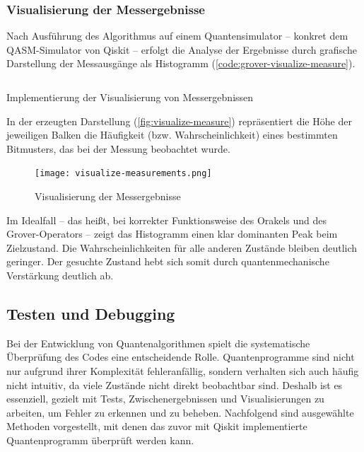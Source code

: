 \subsubsection*{Visualisierung der Messergebnisse}

Nach Ausführung des Algorithmus auf einem Quantensimulator – konkret dem QASM-Simulator von Qiskit – erfolgt die Analyse der Ergebnisse durch grafische Darstellung der Messausgänge als Histogramm (\autoref{code:grover-visualize-measure}).  

\begin{listing}[ht!]
  \inputminted{python}{code/grover-visualize-measure.py}
  \caption{Implementierung der Visualisierung von Messergebnissen}
  \label{code:grover-visualize-measure}
\end{listing}

In der erzeugten Darstellung (\autoref{fig:visualize-measure}) repräsentiert die Höhe der jeweiligen Balken die Häufigkeit (bzw. Wahrscheinlichkeit) eines bestimmten Bitmusters, das bei der Messung beobachtet wurde.

\begin{figure}
    \centering
    \texttt{[image: visualize-measurements.png]}
    \caption{Visualisierung der Messergebnisse}
    \label{fig:visualize-measure}
\end{figure}

Im Idealfall – das heißt, bei korrekter Funktionsweise des Orakels und des Grover-Operators – zeigt das Histogramm einen klar dominanten Peak beim Zielzustand.  Die Wahrscheinlichkeiten für alle anderen Zustände bleiben deutlich geringer.  Der gesuchte Zustand hebt sich somit durch quantenmechanische Verstärkung deutlich ab.

\subsection{Testen und Debugging}

Bei der Entwicklung von Quantenalgorithmen spielt die systematische Überprüfung des Codes eine entscheidende Rolle. Quantenprogramme sind nicht nur aufgrund ihrer Komplexität fehleranfällig, sondern verhalten sich auch häufig nicht intuitiv, da viele Zustände nicht direkt beobachtbar sind. Deshalb ist es essenziell, gezielt mit Tests, Zwischenergebnissen und Visualisierungen zu arbeiten, um Fehler zu erkennen und zu beheben. Nachfolgend sind ausgewählte Methoden vorgestellt, mit denen das zuvor mit Qiskit implementierte Quantenprogramm überprüft werden kann.

